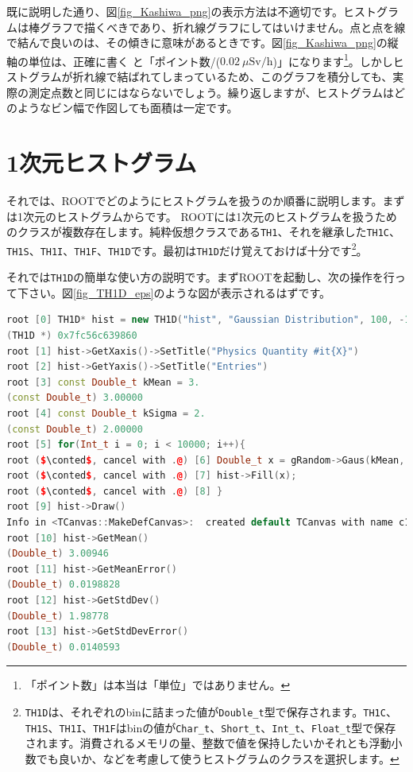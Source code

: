 既に説明した通り、図\ref{fig_Kashiwa_png}の表示方法は不適切です。ヒストグラムは棒グラフで描くべきであり、折れ線グラフにしてはいけません。点と点を線で結んで良いのは、その傾きに意味があるときです。図\ref{fig_Kashiwa_png}の縦軸の単位は、正確に書く と「ポイント数/($0.02\ \mu\mathrm{Sv/h}$)」になります\footnote{「ポイント数」は本当は「単位」ではありません。}。しかしヒストグラムが折れ線で結ばれてしまっているため、このグラフを積分しても、実際の測定点数と同じにはならないでしょう。繰り返しますが、ヒストグラムはどのようなビン幅で作図しても面積は一定です。

\section{1次元ヒストグラム}

それでは、ROOTでどのようにヒストグラムを扱うのか順番に説明します。まずは1次元のヒストグラムからです。 ROOTには1次元のヒストグラムを扱うためのクラスが複数存在します。純粋仮想クラスである\texttt{TH1}、それを継承した\texttt{TH1C}、\texttt{TH1S}、\texttt{TH1I}、\texttt{TH1F}、\texttt{TH1D}です。最初は\texttt{TH1D}だけ覚えておけば十分です\footnote{\texttt{TH1D}は、それぞれのbinに詰まった値が\texttt{Double\_t}型で保存されます。\texttt{TH1C}、\texttt{TH1S}、\texttt{TH1I}、\texttt{TH1F}はbinの値が\texttt{Char\_t}、\texttt{Short\_t}、\texttt{Int\_t}、\texttt{Float\_t}型で保存されます。消費されるメモリの量、整数で値を保持したいかそれとも浮動小数でも良いか、などを考慮して使うヒストグラムのクラスを選択します。}。

それでは\texttt{TH1D}の簡単な使い方の説明です。まずROOTを起動し、次の操作を行って下さい。図\ref{fig_TH1D_eps}のような図が表示されるはずです。

\begin{lstlisting}[language=c++,mathescape]
root [0] TH1D* hist = new TH1D("hist", "Gaussian Distribution", 100, -10, 10)
(TH1D *) 0x7fc56c639860
root [1] hist->GetXaxis()->SetTitle("Physics Quantity #it{X}")
root [2] hist->GetYaxis()->SetTitle("Entries")
root [3] const Double_t kMean = 3.
(const Double_t) 3.00000
root [4] const Double_t kSigma = 2.
(const Double_t) 2.00000
root [5] for(Int_t i = 0; i < 10000; i++){
root ($\conted$, cancel with .@) [6] Double_t x = gRandom->Gaus(kMean, kSigma);
root ($\conted$, cancel with .@) [7] hist->Fill(x);
root ($\conted$, cancel with .@) [8] }
root [9] hist->Draw()
Info in <TCanvas::MakeDefCanvas>:  created default TCanvas with name c1
root [10] hist->GetMean()
(Double_t) 3.00946
root [11] hist->GetMeanError()
(Double_t) 0.0198828
root [12] hist->GetStdDev()
(Double_t) 1.98778
root [13] hist->GetStdDevError()
(Double_t) 0.0140593
\end{lstlisting}


